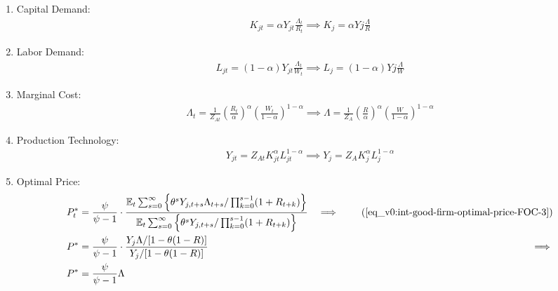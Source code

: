 \documentclass[
thesis.tex
]{subfiles}
\begin{document}
\begin{enumerate}
		\item Capital Demand:
		\begin{align}
			\label{eq_v0:ss-int-good-firm-FOC-Kt}
			K_{jt} = \alpha Y_{jt} \frac{\Lambda_t}{R_t} \implies 
			K_{j} = \alpha Y{j} \frac{\Lambda}{R}
		\end{align}
		
		\item Labor Demand:
		\begin{align}
			\label{eq_v0:ss-int-good-firm-FOC-Lt}
			L_{jt} = (1-\alpha) Y_{jt} \frac{\Lambda_t}{W_t} \implies 
			L_{j} = (1-\alpha) Y{j} \frac{\Lambda}{W}
		\end{align}
		
		
		\item Marginal Cost:
		\begin{align}
			\label{eq_v0:ss-int-good-firm-MC-2}
			\Lambda_t = \frac{1}{Z_{At}} \left( \frac{R_t}{\alpha} \right)^{\alpha} \left( \frac{W_t}{1-\alpha} \right)^{1-\alpha} \implies
			\Lambda = \frac{1}{Z_{A}} \left( \frac{R}{\alpha} \right)^{\alpha} \left( \frac{W}{1-\alpha} \right)^{1-\alpha}
		\end{align}
		
		\item Production Technology:
		\begin{align}
			\label{eq_v0:ss-int-good-firm-production-function}
			Y_{jt} = Z_{At} K_{jt}^\alpha L_{jt}^{1-\alpha} \implies 
			Y_{j} = Z_{A} K_{j}^\alpha L_{j}^{1-\alpha}
		\end{align}
		
		\item Optimal Price:
		\begin{alignat}{2}
			P_t^\ast &= \frac{\psi}{\psi-1} \cdot \frac{\E \sum_{s=0}^{\infty} \left\{\theta^s Y_{j,t+s} \Lambda_{t+s} / \prod_{k=0}^{s-1}(1+R_{t+k}) \right\}} {\E \sum_{s=0}^{\infty} \left\{ \theta^s Y_{j,t+s} / \prod_{k=0}^{s-1}(1+R_{t+k}) \right\}} &\implies \tag{\ref{eq_v0:int-good-firm-optimal-price-FOC-3}} \\
			P^\ast &= \frac{\psi}{\psi-1} \cdot \frac{ Y_j \Lambda / [1-\theta(1-R)]} {Y_j / [1-\theta(1-R)]} &\implies \nonumber \\
			P^\ast &= \frac{\psi}{\psi-1} \Lambda \label{eq_v0:ss-int-good-firm-optimal-price-FOC-3}
		\end{alignat}
		

\end{enumerate}
\end{document}
